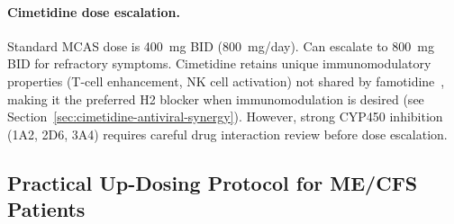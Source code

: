 \paragraph{Cimetidine dose escalation.} Standard MCAS dose is 400~mg BID (800~mg/day). Can escalate to 800~mg BID for refractory symptoms. Cimetidine retains unique immunomodulatory properties (T-cell enhancement, NK cell activation) not shared by famotidine~\cite{Goldstein1986CimetidineEBV}, making it the preferred H2 blocker when immunomodulation is desired (see Section~\ref{sec:cimetidine-antiviral-synergy}). However, strong CYP450 inhibition (1A2, 2D6, 3A4) requires careful drug interaction review before dose escalation.

\subsection{Practical Up-Dosing Protocol for ME/CFS Patients}
\label{sec:updosing-protocol}


